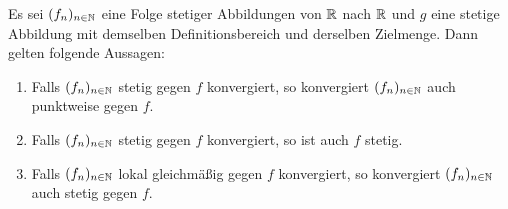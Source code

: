 \begin{prop}
  \label{prop:stetigkonv}
  Es sei $(f_n)_{n \in \mathbb{N}}$ eine Folge stetiger Abbildungen von $\mathbb{R}$ nach $\mathbb{R}$ und $g$ eine stetige Abbildung mit demselben Definitionsbereich und derselben Zielmenge.
  Dann gelten folgende Aussagen:
  \begin{enumerate}[(1)]
    \item Falls $(f_n)_{n \in \mathbb{N}}$ stetig gegen $f$ konvergiert, so konvergiert $(f_n)_{n \in \mathbb{N}}$ auch punktweise gegen $f$.
    \item Falls $(f_n)_{n \in \mathbb{N}}$ stetig gegen $f$ konvergiert, so ist auch $f$ stetig.
    \item Falls $(f_n)_{n \in \mathbb{N}}$ lokal gleichmäßig gegen $f$ konvergiert, so konvergiert $(f_n)_{n \in \mathbb{N}}$ auch stetig gegen $f$.
  \end{enumerate}
\end{prop}

